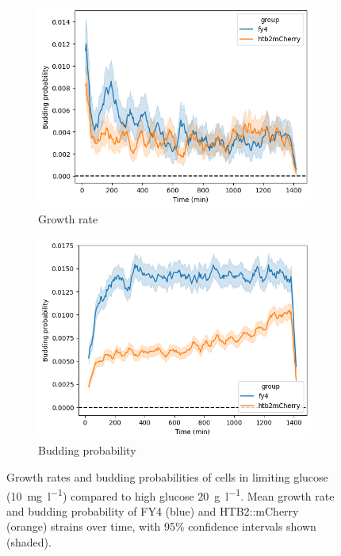\begin{figure}
  \begin{subfigure}[htpb]{0.45\textwidth}
   \centering
   \includegraphics[width=\textwidth]{allstrains_31492_budprob}
   \caption{
     Growth rate
   }
   \label{fig:biology-lowglc-budprob}
  \end{subfigure}%
  \begin{subfigure}[htpb]{0.45\textwidth}
   \centering
   \includegraphics[width=\textwidth]{allstrains_26643_budprob}
   \caption{
     Budding probability
   }
   \label{fig:biology-highglc-gr}
  \end{subfigure}

  \caption{
    Growth rates and budding probabilities of cells in limiting glucose (\SI{10}{\milli\gram~\litre^{-1}}) compared to high glucose \SI{20}{\gram~\litre^{-1}}.
    Mean growth rate and budding probability of FY4 (blue) and HTB2::mCherry (orange) strains over time, with 95\% confidence intervals shown (shaded).
  }
  \label{fig:biology-lowglc-gr-budprob}
\end{figure}



